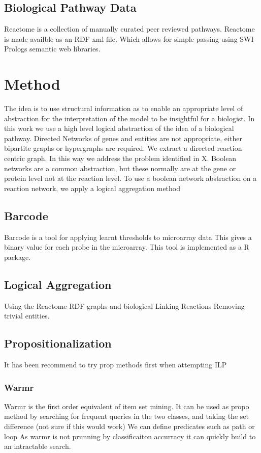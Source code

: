 \documentclass[•]{article}
\begin{document}
	\subsection{Biological Pathway Data}
	Reactome is a collection of manually curated peer reviewed pathways.
	Reactome is made availble as an RDF xml file. Which allows for simple 
	passing using SWI-Prologs semantic web libraries. 
	  
	\section{Method}
	The idea is to use structural information as	to enable an 
	appropriate level of abstraction for the interpretation of the 
	model to be insightful for a biologist. 
	In this work we use a high level logical abstraction of the idea of 
	a biological pathway. 
	Directed Networks of genes and entities are not appropriate, either 
	bipartite graphs or hypergraphs are required.  
	We extract a directed reaction centric graph. In this way we 
	address the problem identified in X. Boolean networks are a common
	abstraction, but these normally are at the gene or protein level
	not at the reaction level. To use a boolean network abstraction on
	a reaction network, we apply a logical aggregation method 
	  \subsection{Barcode}
	  Barcode is a tool for applying learnt thresholds to microarray data
	  This gives a binary value for each probe in the microarray. This tool 
	  is implemented as a R package.
	  \subsection{Logical Aggregation}
	  Using the Reactome RDF graphs and biological 
	  Linking Reactions
	  Removing trivial entities. 
	  \subsection{Propositionalization}
	  It has been recommend to try prop methods first when attempting ILP
	  
	     \subsubsection{Warmr}
	     Warmr is the first order equivalent of item set mining.
	     It can be used as propo method by searching for frequent 
	     queries in the two classes, and taking the set difference 
	     (not sure if this would work)
	     We can define predicates such as path or loop
	     As warmr is not prunning by classificaiton accurracy
	     it can quickly build to an intractable search.
	     
\end{document}
